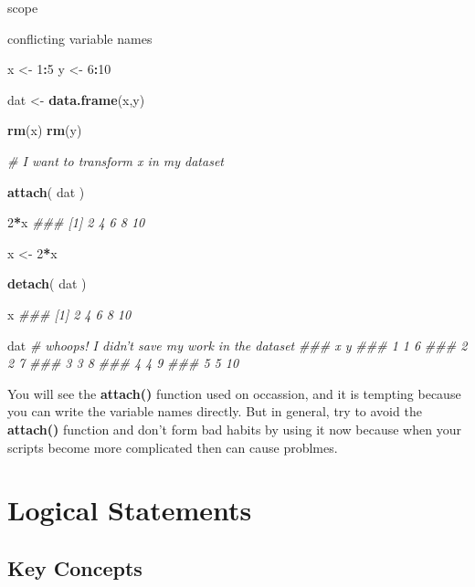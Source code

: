 \documentclass[]{book}
\newenvironment{Shaded}{\begin{snugshade}}{\end{snugshade}}
\newcommand{\CommentTok}[1]{\textcolor[rgb]{0.56,0.35,0.01}{\textit{#1}}}
\newcommand{\DecValTok}[1]{\textcolor[rgb]{0.00,0.00,0.81}{#1}}
\newcommand{\KeywordTok}[1]{\textcolor[rgb]{0.13,0.29,0.53}{\textbf{#1}}}
\newcommand{\NormalTok}[1]{#1}
\newcommand{\OperatorTok}[1]{\textcolor[rgb]{0.81,0.36,0.00}{\textbf{#1}}}
\newcommand{\StringTok}[1]{\textcolor[rgb]{0.31,0.60,0.02}{#1}}
\theoremstyle{definition}
\theoremstyle{definition}
\theoremstyle{definition}
\theoremstyle{remark}
\begin{document}
scope

conflicting variable names

\begin{Shaded}
\begin{Highlighting}[]

\NormalTok{x <-}\StringTok{ }\DecValTok{1}\OperatorTok{:}\DecValTok{5}
\NormalTok{y <-}\StringTok{ }\DecValTok{6}\OperatorTok{:}\DecValTok{10}

\NormalTok{dat <-}\StringTok{ }\KeywordTok{data.frame}\NormalTok{(x,y)}

\KeywordTok{rm}\NormalTok{(x)}
\KeywordTok{rm}\NormalTok{(y)}


\CommentTok{# I want to transform x in my dataset}

\KeywordTok{attach}\NormalTok{( dat )}

\DecValTok{2}\OperatorTok{*}\NormalTok{x}
\CommentTok{### [1]  2  4  6  8 10}

\NormalTok{x <-}\StringTok{ }\DecValTok{2}\OperatorTok{*}\NormalTok{x}

\KeywordTok{detach}\NormalTok{( dat )}

\NormalTok{x}
\CommentTok{### [1]  2  4  6  8 10}

\NormalTok{dat  }\CommentTok{# whoops! I didn't save my work in the dataset}
\CommentTok{###   x  y}
\CommentTok{### 1 1  6}
\CommentTok{### 2 2  7}
\CommentTok{### 3 3  8}
\CommentTok{### 4 4  9}
\CommentTok{### 5 5 10}
\end{Highlighting}
\end{Shaded}

You will see the \textbf{attach()} function used on occassion, and it is
tempting because you can write the variable names directly. But in
general, try to avoid the \textbf{attach()} function and don't form bad
habits by using it now because when your scripts become more complicated
then can cause problmes.

\hypertarget{logical-statements}{%
\chapter{Logical Statements}\label{logical-statements}}

\hypertarget{key-concepts-2}{%
\section{Key Concepts}\label{key-concepts-2}}
\end{document}
